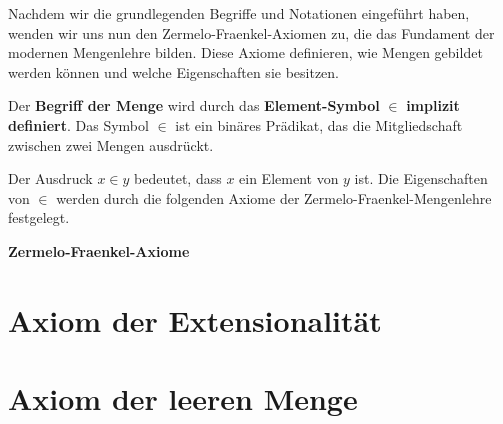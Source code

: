 \documentclass[main.tex]{subfiles}
\begin{document}
Nachdem wir die grundlegenden Begriffe und Notationen eingeführt haben, wenden wir uns nun den Zermelo-Fraenkel-Axiomen zu, die das Fundament der modernen Mengenlehre bilden. Diese Axiome definieren, wie Mengen gebildet werden können und welche Eigenschaften sie besitzen.
\begin{definition}
Der \textbf{Begriff der Menge} wird durch das \textbf{Element-Symbol} \(\in\) \textbf{implizit definiert}. 
Das Symbol \(\in\) ist ein binäres Prädikat, das die Mitgliedschaft zwischen zwei Mengen ausdrückt. 

Der Ausdruck \(x \in y\) bedeutet, dass \(x\) ein Element von \(y\) ist. Die Eigenschaften von \(\in\) 
werden durch die folgenden Axiome der Zermelo-Fraenkel-Mengenlehre festgelegt.


\noindent\textbf{Zermelo-Fraenkel-Axiome}
\begin{AxTable}
\end{AxTable}
\end{definition}

\section{Axiom der Extensionalität}

%
{%
% 
}%

\section{Axiom der leeren Menge}
\end{document}
